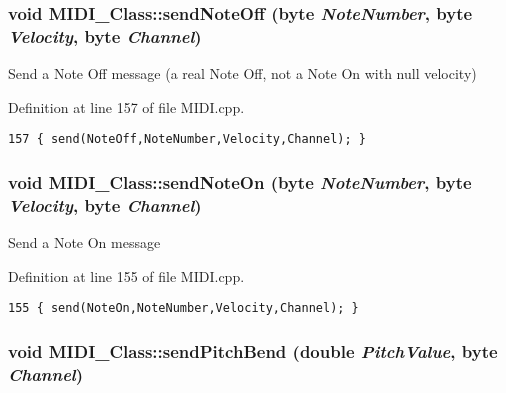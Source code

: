 \hypertarget{class_m_i_d_i___class_381e1e8019aae5f872279cda496f964c}{
\subsubsection[{sendNoteOff}]{\setlength{\rightskip}{0pt plus 5cm}void MIDI\_\-Class::sendNoteOff ({\bf byte} {\em NoteNumber}, \/  {\bf byte} {\em Velocity}, \/  {\bf byte} {\em Channel})}}
\label{class_m_i_d_i___class_381e1e8019aae5f872279cda496f964c}


Send a Note Off message (a real Note Off, not a Note On with null velocity) 

Definition at line 157 of file MIDI.cpp.

\begin{Code}\begin{verbatim}157 { send(NoteOff,NoteNumber,Velocity,Channel); }
\end{verbatim}
\end{Code}


\hypertarget{class_m_i_d_i___class_9664e523b35d8b42749e7bc3ba888943}{
\subsubsection[{sendNoteOn}]{\setlength{\rightskip}{0pt plus 5cm}void MIDI\_\-Class::sendNoteOn ({\bf byte} {\em NoteNumber}, \/  {\bf byte} {\em Velocity}, \/  {\bf byte} {\em Channel})}}
\label{class_m_i_d_i___class_9664e523b35d8b42749e7bc3ba888943}


Send a Note On message 

Definition at line 155 of file MIDI.cpp.

\begin{Code}\begin{verbatim}155 { send(NoteOn,NoteNumber,Velocity,Channel); }
\end{verbatim}
\end{Code}


\hypertarget{class_m_i_d_i___class_16800e955a1d0d66e6bda6727588b1eb}{
\subsubsection[{sendPitchBend}]{\setlength{\rightskip}{0pt plus 5cm}void MIDI\_\-Class::sendPitchBend (double {\em PitchValue}, \/  {\bf byte} {\em Channel})}}
\label{class_m_i_d_i___class_16800e955a1d0d66e6bda6727588b1eb}


